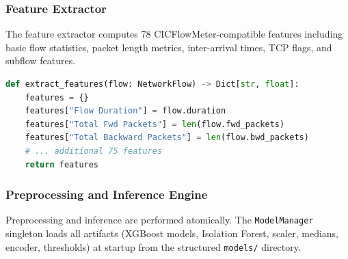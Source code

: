\documentclass[12pt,a4paper]{article}
\begin{document}
\subsubsection{Feature Extractor}
\label{sec:core_feature}

The feature extractor computes 78 CICFlowMeter-compatible features including basic flow statistics, packet length metrics, inter-arrival times, TCP flags, and subflow features.

\begin{lstlisting}[language=Python, caption=Feature Extraction Snippet]
def extract_features(flow: NetworkFlow) -> Dict[str, float]:
    features = {}
    features["Flow Duration"] = flow.duration
    features["Total Fwd Packets"] = len(flow.fwd_packets)
    features["Total Backward Packets"] = len(flow.bwd_packets)
    # ... additional 75 features
    return features
\end{lstlisting}

\subsubsection{Preprocessing and Inference Engine}
\label{sec:core_inference}

Preprocessing and inference are performed atomically. The \texttt{ModelManager} singleton loads all artifacts (XGBoost models, Isolation Forest, scaler, medians, encoder, thresholds) at startup from the structured \texttt{models/} directory.
\end{document}
